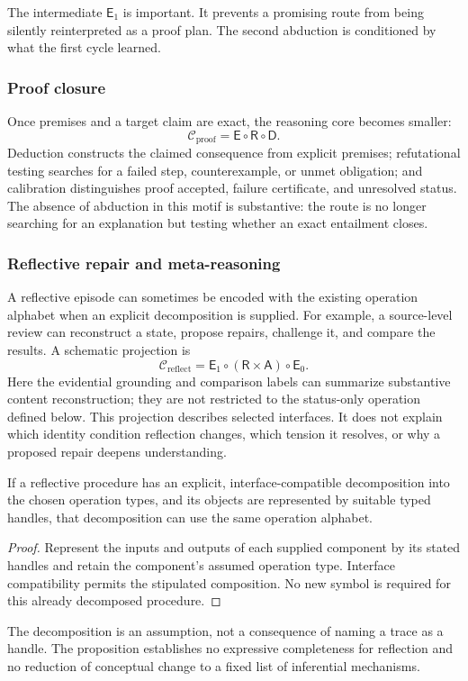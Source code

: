The intermediate $\mathsf{E}_{1}$ is important. It prevents a promising route
from being silently reinterpreted as a proof plan. The second abduction is
conditioned by what the first cycle learned.

\subsubsection{Proof closure}

Once premises and a target claim are exact, the reasoning core becomes
smaller:
\[
  \mathcal{C}_{\mathrm{proof}}
  =\mathsf{E}\circ\mathsf{R}\circ\mathsf{D}.
\]
Deduction constructs the claimed consequence from explicit premises;
refutational testing searches for a failed step, counterexample, or unmet
obligation; and calibration distinguishes proof accepted, failure certificate,
and unresolved status. The absence of abduction in this motif is substantive:
the route is no longer searching for an explanation but testing whether an
exact entailment closes.

\subsubsection{Reflective repair and meta-reasoning}

A reflective episode can sometimes be encoded with the existing operation
alphabet when an explicit decomposition is supplied. For example, a source-level
review can reconstruct a state, propose repairs, challenge it, and compare the
results. A schematic projection is
\[
  \mathcal{C}_{\mathrm{reflect}}
  =\mathsf{E}_{1}\circ(\mathsf{R}\times\mathsf{A})\circ\mathsf{E}_{0}.
\]
Here the evidential grounding and comparison labels can summarize substantive
content reconstruction; they are not restricted to the status-only operation
defined below. This projection describes selected interfaces. It does not explain
which identity condition reflection changes, which tension it resolves, or why
a proposed repair deepens understanding.

\begin{proposition}
If a reflective procedure has an explicit, interface-compatible decomposition
into the chosen operation types, and its objects are represented by suitable
typed handles, that decomposition can use the same operation alphabet.
\end{proposition}
\begin{proof}
Represent the inputs and outputs of each supplied component by its stated
handles and retain the component's assumed operation type. Interface compatibility
permits the stipulated composition. No new symbol is required for this already
decomposed procedure.
\end{proof}
The decomposition is an assumption, not a consequence of naming a trace as a
handle. The proposition establishes no expressive completeness for reflection
and no reduction of conceptual change to a fixed list of inferential mechanisms.

